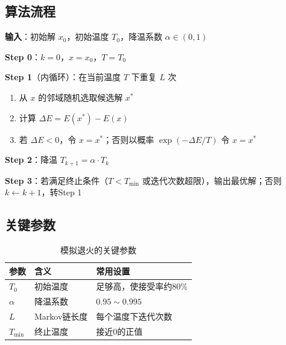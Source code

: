 \subsection{算法流程}

\begin{algobox}[模拟退火算法]
\textbf{输入}：初始解 $x_0$，初始温度 $T_0$，降温系数 $\alpha \in (0, 1)$

\textbf{Step 0}：$k = 0$，$x = x_0$，$T = T_0$

\textbf{Step 1}（内循环）：在当前温度 $T$ 下重复 $L$ 次
\begin{enumerate}[label=\arabic*., leftmargin=1em]
    \item 从 $x$ 的邻域随机选取候选解 $x^*$
    \item 计算 $\Delta E = E(x^*) - E(x)$
    \item 若 $\Delta E < 0$，令 $x = x^*$；否则以概率 $\exp(-\Delta E / T)$ 令 $x = x^*$
\end{enumerate}

\textbf{Step 2}：降温 $T_{k+1} = \alpha \cdot T_k$

\textbf{Step 3}：若满足终止条件（$T < T_{\min}$ 或迭代次数超限），输出最优解；否则 $k \leftarrow k+1$，转Step 1
\end{algobox}

\subsection{关键参数}

\begin{table}[htbp]
\centering
\caption{模拟退火的关键参数}
\begin{tabular}{@{}lll@{}}
\toprule
\textbf{参数} & \textbf{含义} & \textbf{常用设置} \\
\midrule
$T_0$ & 初始温度 & 足够高，使接受率约80\% \\
$\alpha$ & 降温系数 & $0.95 \sim 0.995$ \\
$L$ & Markov链长度 & 每个温度下迭代次数 \\
$T_{\min}$ & 终止温度 & 接近0的正值 \\
\bottomrule
\end{tabular}
\end{table}

